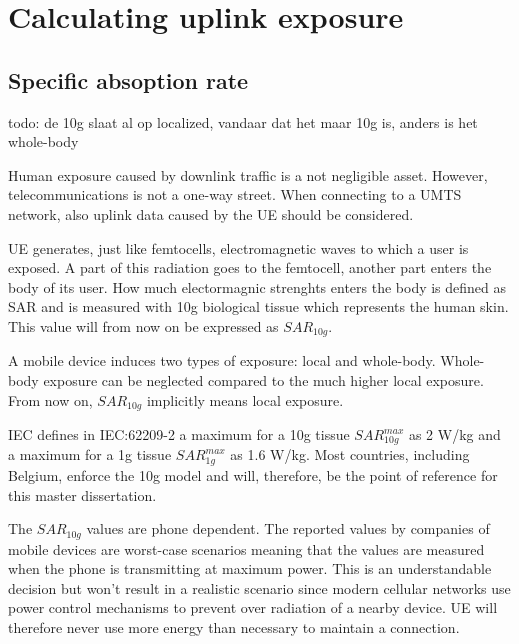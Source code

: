 



\section{Calculating uplink exposure}
\subsection{Specific absoption rate}
\label{sec:sar}

todo: de 10g slaat al op localized, vandaar dat het maar 10g is, anders is het whole-body


Human exposure caused by downlink traffic is a not negligible asset. However, telecommunications is not a one-way street. When connecting to a UMTS network, also uplink data caused by the \gls{UE} should be considered.

\gls{UE} generates, just like femtocells, electromagnetic waves to which a user is exposed. A part of this radiation goes to the femtocell, another part enters the body of its user. How much electormagnic strenghts enters the body is defined as \gls{SAR} and is measured with 10g biological tissue which represents the human skin. This value will from now on be expressed as $SAR_{10g}$. 

A mobile device induces two types of exposure: local and whole-body. Whole-body exposure can be neglected compared to the much higher local exposure\cite{j10.1.1_gati2010duality}.  From now on, $SAR_{10g}$ implicitly means local exposure.

\gls{IEC} defines in IEC:62209-2 a maximum for a 10g tissue $SAR^{max}_{10g}$ as 2 W/kg and a maximum for a 1g tissue $SAR^{max}_{1g}$ as 1.6 W/kg. Most countries, including Belgium, enforce the 10g model and will, therefore, be the point of reference for this master dissertation.

The $SAR_{10g}$ values are phone dependent. The reported values by companies of mobile devices are worst-case scenarios meaning that the values are measured when the phone is transmitting at maximum power. This is an understandable decision but won't result in a realistic scenario since modern cellular networks use power control mechanisms to prevent over radiation of a nearby device. \gls{UE} will therefore never use more energy than necessary to maintain a connection.


